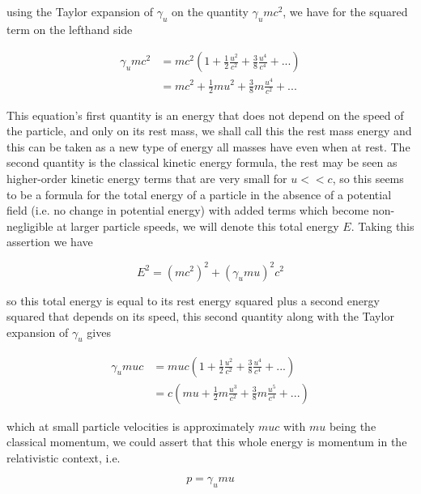using the Taylor expansion of $\gamma_{u}$ on the quantity $\gamma_{u} mc^2$, we have for the squared term on the lefthand side

\begin{equation}
	\begin{aligned}
		\gamma_{u} mc^2 & = mc^2  \left(1 + \frac{1}{2}\frac{u^2}{c^2} + \frac{3}{8}\frac{u^4}{c^4} + ... \right) \\
		                & = mc^2   + \frac{1}{2}mu^2 + \frac{3}{8}m\frac{u^4}{c^2} + ...
	\end{aligned}
\end{equation}

This equation's first quantity is an energy that does not depend on the speed of the particle, and only on its rest mass, we shall call this the rest mass energy and this can be taken as a new type of energy all masses have even when at rest. The second quantity is the classical kinetic energy formula, the rest may be seen as higher-order kinetic energy terms that are very small for $u<<c$, so this seems to be a formula for the total energy of a particle in the absence of a potential field (i.e. no change in potential energy) with added terms which become non-negligible at larger particle speeds, we will denote this total energy $E$. Taking this assertion we have

\begin{equation}
	E^2 = \left( mc^2 \right)^2 + (\gamma_{u}mu)^2c^2
\end{equation}

so this total energy is equal to its rest energy squared plus a second energy squared that depends on its speed, this second quantity along with the Taylor expansion of $\gamma_{u}$ gives

\begin{equation}
	\begin{aligned}
		\gamma_{u} muc & = muc  \left(1 + \frac{1}{2}\frac{u^2}{c^2} + \frac{3}{8}\frac{u^4}{c^4} + ... \right)     \\
		               & = c \left( mu   + \frac{1}{2}m \frac{u^3}{c^2} + \frac{3}{8}m\frac{u^5}{c^4} + ... \right)
	\end{aligned}
\end{equation}

which at small particle velocities is approximately $muc$ with $mu$ being the classical momentum, we could assert that this whole energy is momentum in the relativistic context, i.e.

\begin{equation}
	p = \gamma_{u} mu
\end{equation}

